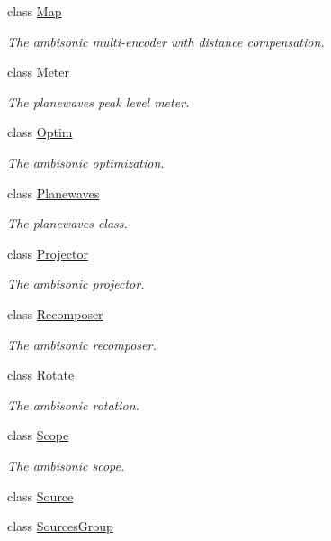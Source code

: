 \begin{DoxyCompactItemize}
class \hyperlink{class_hoa2_d_1_1_map}{Map}
\begin{DoxyCompactList}\small\item\em The ambisonic multi-\/encoder with distance compensation. \end{DoxyCompactList}\item 
class \hyperlink{class_hoa2_d_1_1_meter}{Meter}
\begin{DoxyCompactList}\small\item\em The planewaves peak level meter. \end{DoxyCompactList}\item 
class \hyperlink{class_hoa2_d_1_1_optim}{Optim}
\begin{DoxyCompactList}\small\item\em The ambisonic optimization. \end{DoxyCompactList}\item 
class \hyperlink{class_hoa2_d_1_1_planewaves}{Planewaves}
\begin{DoxyCompactList}\small\item\em The planewaves class. \end{DoxyCompactList}\item 
class \hyperlink{class_hoa2_d_1_1_projector}{Projector}
\begin{DoxyCompactList}\small\item\em The ambisonic projector. \end{DoxyCompactList}\item 
class \hyperlink{class_hoa2_d_1_1_recomposer}{Recomposer}
\begin{DoxyCompactList}\small\item\em The ambisonic recomposer. \end{DoxyCompactList}\item 
class \hyperlink{class_hoa2_d_1_1_rotate}{Rotate}
\begin{DoxyCompactList}\small\item\em The ambisonic rotation. \end{DoxyCompactList}\item 
class \hyperlink{class_hoa2_d_1_1_scope}{Scope}
\begin{DoxyCompactList}\small\item\em The ambisonic scope. \end{DoxyCompactList}\item 
class \hyperlink{class_hoa2_d_1_1_source}{Source}
\item 
class \hyperlink{class_hoa2_d_1_1_sources_group}{Sources\-Group}

\end{DoxyCompactItemize}
